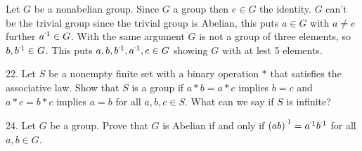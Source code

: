 \begin{mdframed}[style=darkAnswer,frametitle={Joe Starr}]
Let $G$ be a nonabelian group. Since $G$ a group then $e\in G$ the identity. $G$
can't be the trivial group since the trivial group is Abelian, this puts
$a\in G$ with $a\neq e$ further $\inv{a}\in G$. With the same argument $G$ is
not a group of three elements, so $b,\inv{b}\in G$. This puts
$a,b,\inv{b},\inv{a},e\in G$ showing $G$ with at lest 5 elements.
\end{mdframed}
\newpage
\begin{mdframed}[style=darkQuesion]
22. Let $S$ be a nonempty finite set with a binary operation $\ast$ that
satisfies the associative law. Show that $S$ is a group if $a\ast b=a\ast c$
implies $b=c$ and $a\ast c= b\ast c$ implies $a=b$ for all $a,b,c \in S$.
What can we say if $S$ is infinite?
\end{mdframed}

\begin{mdframed}[style=darkAnswer,frametitle={Joe Starr}]
\end{mdframed}
\newpage
\begin{mdframed}[style=darkQuesion]
24. Let $G$ be a group. Prove that $G$ is Abelian if and only if
$\inv{\lrp{ab}}=\inv{a}\inv{b}$ for all $a,b\in G$.
\end{mdframed}

